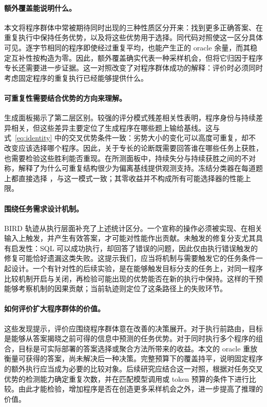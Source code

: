 \paragraph{额外覆盖能说明什么。}
本文将程序群体中常被期待同时出现的三种性质区分开来：找到更多正确答案、在重复执行中保持任务优势，以及将这些优势用于选择。同代码对照使这一区分具体可见。逐字节相同的程序即使经过重复平均，也能产生正的 oracle 余量，而其稳定互补性按构造为零。因此，额外覆盖确实代表一种采样机会，但将它归因于程序专长还需要进一步证据。这一对照改变了对程序群体成功的解释：评价时必须同时考虑固定程序的重复执行已经能够提供什么。

\paragraph{可重复性需要结合优势的方向来理解。}
生成面板揭示了第二层区别。较强的评分模式残差相关性表明，程序身份与持续差异相关，但这些差异主要定位了生成程序在哪些题上输给基线。这与式~\ref{eq:identity} 中的交叉优势条件一致：劣势大小的变化可以高度可重复，却不改变应该选择哪个程序。因此，关于专长的论断既需要回答谁在哪些任务上获胜，也需要检验这些胜利能否重现。在所测面板中，持续失分与持续获胜之间的不对称，解释了为什么可重复结构很少为偏离基线提供观测支持。冻结分类器在每道题上都直接选择 \bare{}，与这一模式一致；其零收益并不构成所有可能选择器的性能上限。

\paragraph{围绕任务需求设计机制。}
BIRD 轨迹从执行层面补充了上述统计区分。一个宣称的操作必须被实现、在相关输入上触发，并产生有效答案，才可能对性能作出贡献。未触发的修复分支尤其具有启发性：SQL 可以成功执行，却回答了错误的问题，因此仅由执行错误触发的修复可能恰好遗漏这类失败。这提示我们，应当将机制与需要触发它的任务条件一起设计。一个有针对性的后续实验，是在能够触发目标分支的任务上，对同一程序比较机制开启与关闭，再检验可能出现的优势能否在新的执行中保持。这样的干预能够考察机制的因果贡献；当前轨迹则定位了这条路径上的失败环节。

\paragraph{如何评价扩大程序群体的价值。}
这些发现提示，评价应围绕程序群体意在改善的决策展开。对于执行前路由，目标是能够从答案揭晓之前可得的信息中预测的任务优势。对于同时执行多个程序的组合，目标是可实际部署的答案选择或聚合方法所带来的收益。本文的 oracle 重放衡量可获得的答案，尚未解决后一种决策。完整预算下的覆盖持平，说明固定程序的额外执行应当成为必要的比较对象。后续研究应结合这一对照，根据对任务交叉优势的检测能力确定重复次数，并在匹配模型调用或 token 预算的条件下进行比较。由此才能检验，增加程序是否在创造更多采样机会之外，进一步提高了推理的价值。

